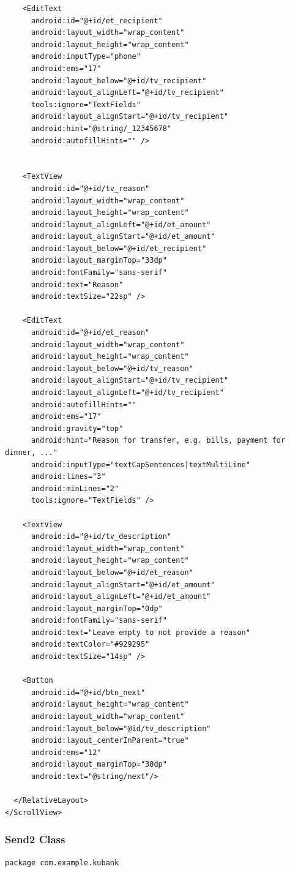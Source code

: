 \documentclass[11pt, a4paper]{article}
\begin{document}
\begin{appendices}
\begin{lstlisting}
    <EditText
      android:id="@+id/et_recipient"
      android:layout_width="wrap_content"
      android:layout_height="wrap_content"
      android:inputType="phone"
      android:ems="17"
      android:layout_below="@+id/tv_recipient"
      android:layout_alignLeft="@+id/tv_recipient"
      tools:ignore="TextFields"
      android:layout_alignStart="@+id/tv_recipient"
      android:hint="@string/_12345678"
      android:autofillHints="" />


    <TextView
      android:id="@+id/tv_reason"
      android:layout_width="wrap_content"
      android:layout_height="wrap_content"
      android:layout_alignLeft="@+id/et_amount"
      android:layout_alignStart="@+id/et_amount"
      android:layout_below="@+id/et_recipient"
      android:layout_marginTop="33dp"
      android:fontFamily="sans-serif"
      android:text="Reason"
      android:textSize="22sp" />

    <EditText
      android:id="@+id/et_reason"
      android:layout_width="wrap_content"
      android:layout_height="wrap_content"
      android:layout_below="@+id/tv_reason"
      android:layout_alignStart="@+id/tv_recipient"
      android:layout_alignLeft="@+id/tv_recipient"
      android:autofillHints=""
      android:ems="17"
      android:gravity="top"
      android:hint="Reason for transfer, e.g. bills, payment for dinner, ..."
      android:inputType="textCapSentences|textMultiLine"
      android:lines="3"
      android:minLines="2"
      tools:ignore="TextFields" />

    <TextView
      android:id="@+id/tv_description"
      android:layout_width="wrap_content"
      android:layout_height="wrap_content"
      android:layout_below="@+id/et_reason"
      android:layout_alignStart="@+id/et_amount"
      android:layout_alignLeft="@+id/et_amount"
      android:layout_marginTop="0dp"
      android:fontFamily="sans-serif"
      android:text="Leave empty to not provide a reason"
      android:textColor="#929295"
      android:textSize="14sp" />

    <Button
      android:id="@+id/btn_next"
      android:layout_height="wrap_content"
      android:layout_width="wrap_content"
      android:layout_below="@id/tv_description"
      android:layout_centerInParent="true"
      android:ems="12"
      android:layout_marginTop="30dp"
      android:text="@string/next"/>

  </RelativeLayout>
</ScrollView>
\end{lstlisting}
\subsubsection{Send2 Class}
\begin{lstlisting}
package com.example.kubank


\end{lstlisting}
\end{appendices}
\end{document}
